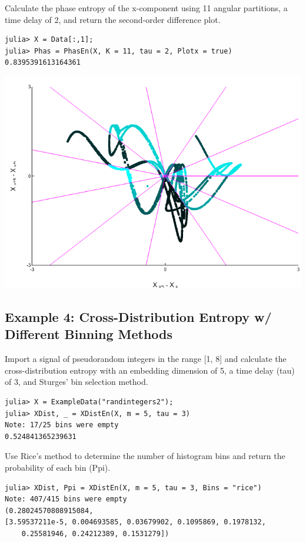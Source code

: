 \documentclass[12pt, a4paper, titlepage, openany]{book}
\begin{document}
Calculate the phase  entropy of the x-component using 11 angular partitions, a time delay of 2, and return the second-order difference plot.
\begin{verbatim}
julia> X = Data[:,1];
julia> Phas = PhasEn(X, K = 11, tau = 2, Plotx = true)
0.8395391613164361
\end{verbatim}
\includegraphics[scale=.5]{phasx2jl.png}


\newpage
\subsection{\normalsize Example 4: \hspace{15mm} Cross-Distribution Entropy w/ Different Binning Methods}
\noindent Import a signal of pseudorandom integers in the range [1, 8] and calculate the cross-distribution entropy with an embedding dimension of 5, a time delay (tau) of 3, and Sturges' bin selection method.
\begin{verbatim}
julia> X = ExampleData("randintegers2");
julia> XDist, _ = XDistEn(X, m = 5, tau = 3)
Note: 17/25 bins were empty
0.524841365239631
\end{verbatim}
Use Rice's method to determine the number of histogram bins and return the probability of each bin (Ppi).
\begin{verbatim}
julia> XDist, Ppi = XDistEn(X, m = 5, tau = 3, Bins = "rice")
Note: 407/415 bins were empty
(0.28024570808915084, 
[3.59537211e-5, 0.004693585, 0.03679902, 0.1095869, 0.1978132,
    0.25581946, 0.24212389, 0.1531279])
\end{verbatim}
\end{document}

